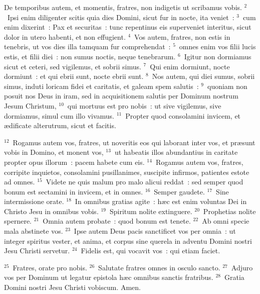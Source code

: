 \bchapter
\lettrine[lines=3,image=true,loversize=0.05,lraise=-0.03]{D}{}e temporibus autem, et momentis, fratres, non indigetis ut scribamus vobis.
${}^{2}$~Ipsi enim diligenter scitis quia dies Domini, sicut fur in nocte, ita veniet~:
${}^{3}$~cum enim dixerint~: Pax et securitas~: tunc repentinus eis superveniet interitus, sicut dolor in utero habenti, et non effugient.
${}^{4}$~Vos autem, fratres, non estis in tenebris, ut vos dies illa tamquam fur comprehendat~:
${}^{5}$~omnes enim vos filii lucis estis, et filii diei~: non sumus noctis, neque tenebrarum.
${}^{6}$~Igitur non dormiamus sicut et ceteri, sed vigilemus, et sobrii simus.
${}^{7}$~Qui enim dormiunt, nocte dormiunt~: et qui ebrii sunt, nocte ebrii sunt.
${}^{8}$~Nos autem, qui diei sumus, sobrii simus, induti loricam fidei et caritatis, et galeam spem salutis~:
${}^{9}$~quoniam non posuit nos Deus in iram, sed in acquisitionem salutis per Dominum nostrum Jesum Christum,
${}^{10}$~qui mortuus est pro nobis~: ut sive vigilemus, sive dormiamus, simul cum illo vivamus.
${}^{11}$~Propter quod consolamini invicem, et \ae dificate alterutrum, sicut et facitis.


${}^{12}$~Rogamus autem vos, fratres, ut noveritis eos qui laborant inter vos, et pr\ae sunt vobis in Domino, et monent vos,
${}^{13}$~ut habeatis illos abundantius in caritate propter opus illorum~: pacem habete cum eis.
${}^{14}$~Rogamus autem vos, fratres, corripite inquietos, consolamini pusillanimes, suscipite infirmos, patientes estote ad omnes.
${}^{15}$~Videte ne quis malum pro malo alicui reddat~: sed semper quod bonum est sectamini in invicem, et in omnes.
${}^{16}$~Semper gaudete.
${}^{17}$~Sine intermissione orate.
${}^{18}$~In omnibus gratias agite~: h\ae c est enim voluntas Dei in Christo Jesu in omnibus vobis.
${}^{19}$~Spiritum nolite extinguere.
${}^{20}$~Prophetias nolite spernere.
${}^{21}$~Omnia autem probate~: quod bonum est tenete.
${}^{22}$~Ab omni specie mala abstinete vos.
${}^{23}$~Ipse autem Deus pacis sanctificet vos per omnia~: ut integer spiritus vester, et anima, et corpus sine querela in adventu Domini nostri Jesu Christi servetur.
${}^{24}$~Fidelis est, qui vocavit vos~: qui etiam faciet.


${}^{25}$~Fratres, orate pro nobis.
${}^{26}$~Salutate fratres omnes in osculo sancto.
${}^{27}$~Adjuro vos per Dominum ut legatur epistola h\ae c omnibus sanctis fratribus.
${}^{28}$~Gratia Domini nostri Jesu Christi vobiscum. Amen.
